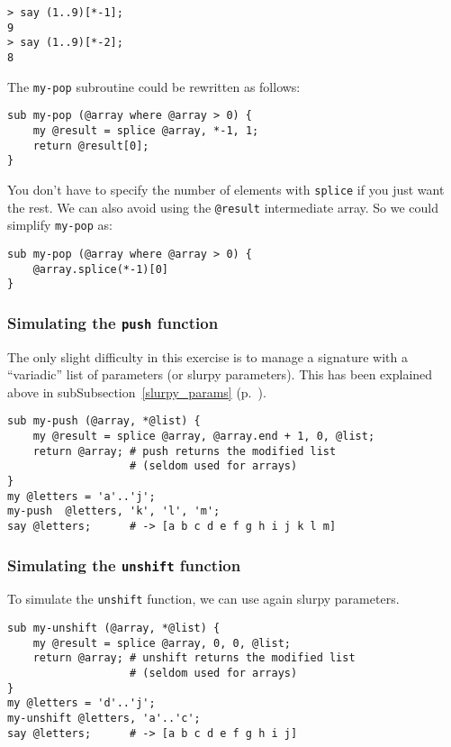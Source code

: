 \begin{verbatim}
> say (1..9)[*-1];
9
> say (1..9)[*-2];
8
\end{verbatim}

The {\tt my-pop} subroutine could be rewritten as follows:

\begin{verbatim}
sub my-pop (@array where @array > 0) {
    my @result = splice @array, *-1, 1;
    return @result[0];
}
\end{verbatim}

You don't have to specify the number of elements with 
{\tt splice} if you just want the rest. We can also 
avoid using the \verb'@result'  intermediate array. 
So we could simplify {\tt my-pop} as:

\begin{verbatim}
sub my-pop (@array where @array > 0) {
    @array.splice(*-1)[0]
}
\end{verbatim}


\subsubsection{Simulating the {\tt push} function}

The only slight difficulty in this exercise is to manage a signature with a 
``variadic'' list of parameters (or slurpy parameters). This 
has been explained above in subSubsection~\ref{slurpy_params} 
(p.~\pageref{slurpy_params}).

\begin{verbatim}
sub my-push (@array, *@list) {
    my @result = splice @array, @array.end + 1, 0, @list;
    return @array; # push returns the modified list
                   # (seldom used for arrays)
}
my @letters = 'a'..'j';
my-push  @letters, 'k', 'l', 'm';
say @letters;      # -> [a b c d e f g h i j k l m]
\end{verbatim}

\subsubsection{Simulating the {\tt unshift} function}

To simulate the \verb'unshift' function, we can use 
again slurpy parameters.

\begin{verbatim}
sub my-unshift (@array, *@list) {
    my @result = splice @array, 0, 0, @list;
    return @array; # unshift returns the modified list
                   # (seldom used for arrays)
}
my @letters = 'd'..'j';
my-unshift @letters, 'a'..'c';
say @letters;      # -> [a b c d e f g h i j]
\end{verbatim}

